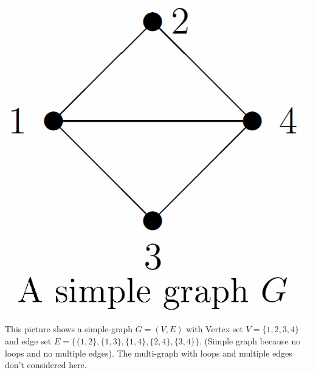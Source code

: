 \begin{minipage}{0.15\textwidth}
\includegraphics[width=\textwidth,trim= 0cm 2cm 0cm 0cm,clip]{./Content/Markov/simpleGraph}
\end{minipage}
\hfill
\begin{minipage}{0.8\textwidth}
This picture shows a simple-graph $G=(V,E)$ with Vertex set $V=\{1,2,3,4\}$ and edge set $E=\{\{1,2\},\{1,3\},\{1,4\},\{2,4\},\{3,4\}\}$. (Simple graph because no loops and no multiple edges). The multi-graph with loops and multiple edges don't considered here.
\end{minipage}


